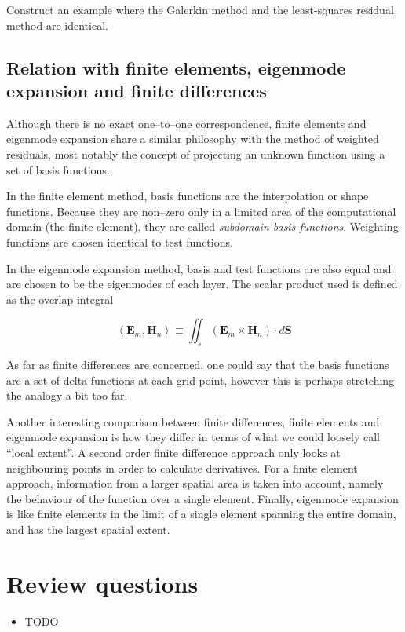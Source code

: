 \begin{exer}
Construct an example where the Galerkin method and the least-squares residual method are identical.
\end{exer}


\subsection{Relation with finite elements, eigenmode expansion and finite differences}

Although there is no exact one--to--one correspondence, finite elements and eigenmode expansion share a similar philosophy with the method of weighted residuals, most notably the concept of projecting an unknown function using a set of basis functions.

In the finite element method, basis functions are the interpolation or shape functions. Because they are non--zero only in a limited area of the computational domain (the finite element), they are called \emph{subdomain basis functions}. Weighting functions are chosen identical to test functions. 

In the eigenmode expansion method, basis and test functions are also equal and are chosen to be the eigenmodes of each layer. The scalar product used is defined as the overlap integral 

\begin{equation}
\left\langle \mathbf{E}_{m},\mathbf{H}_{n}\right\rangle \equiv \iint _{s}\left( \mathbf{E}_{m}\times \mathbf{H}_{n}\right) \cdot d{\mathbf S}
\end{equation}

As far as finite differences are concerned, one could say that the basis functions are a set of delta functions at each grid point, however this is perhaps stretching the analogy a bit too far.

Another interesting comparison between finite differences, finite elements and eigenmode expansion is how they differ in terms of what we could loosely call ``local extent''. A second order finite difference approach only looks at neighbouring points in order to calculate derivatives. For a finite element approach, information from a larger spatial area is taken into account, namely the behaviour of the function over a single element. Finally, eigenmode expansion is like finite elements in the limit of a single element spanning the entire domain, and has the largest spatial extent.

\section*{Review questions}

\begin{itemize}
\item TODO
\end{itemize}


